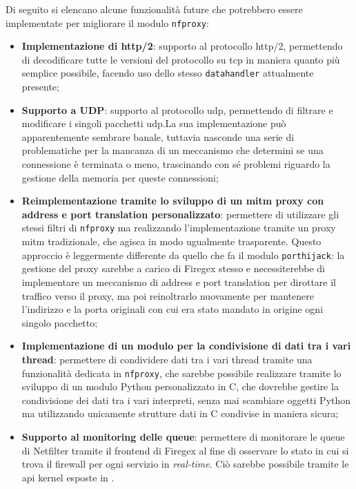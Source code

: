 Di seguito si elencano alcune funzionalità future che potrebbero essere implementate per migliorare il modulo \texttt{\gls{nfproxy}}:

\begin{itemize}
    \setlength{\itemsep}{2pt}
    \setlength{\parskip}{2pt}
    \item \textbf{Implementazione di \gls{http}/2}: supporto al protocollo \gls{http}/2, permettendo di decodificare tutte le versioni del protocollo su \gls{tcp} in maniera quanto più semplice possibile, facendo uso dello stesso \texttt{datahandler} attualmente presente;

    \item \textbf{Supporto a UDP}: supporto al protocollo \gls{udp}, permettendo di filtrare e modificare i singoli pacchetti \gls{udp}.\@ La sua implementazione può apparentemente sembrare banale, tuttavia nasconde una serie di problematiche per la mancanza di un meccanismo che determini se una connessione è terminata o meno, trascinando con sé problemi riguardo la gestione della memoria per queste connessioni;

    \item \textbf{Reimplementazione tramite lo sviluppo di un \gls{mitm} proxy con address e port translation personalizzato}: permettere di utilizzare gli stessi filtri di \texttt{\gls{nfproxy}} ma realizzando l'implementazione tramite un proxy \gls{mitm} tradizionale, che agisca in modo ugualmente trasparente. Questo approccio è leggermente differente da quello che fa il modulo \texttt{\gls{porthijack}}: la gestione del proxy sarebbe a carico di Firegex stesso e necessiterebbe di implementare un meccanismo di address e port translation per dirottare il traffico verso il proxy, ma poi reinoltrarlo nuovamente per mantenere l'indirizzo e la porta originali con cui era stato mandato in origine ogni singolo pacchetto;

    \item \textbf{Implementazione di un modulo per la condivisione di dati tra i vari thread}: permettere di condividere dati tra i vari thread tramite una funzionalità dedicata in \texttt{\gls{nfproxy}}, che sarebbe possibile realizzare tramite lo sviluppo di un modulo Python personalizzato in C, che dovrebbe gestire la condivisione dei dati tra i vari interpreti, senza mai scambiare oggetti Python ma utilizzando unicamente strutture dati in C condivise in maniera sicura;

    \item \textbf{Supporto al monitoring delle queue}: permettere di monitorare le queue di Netfilter tramite il frontend di Firegex al fine di osservare lo stato in cui si trova il firewall per ogni servizio in \textit{real-time}. Ciò sarebbe possibile tramite le \gls{api} kernel esposte in .
\end{itemize}

